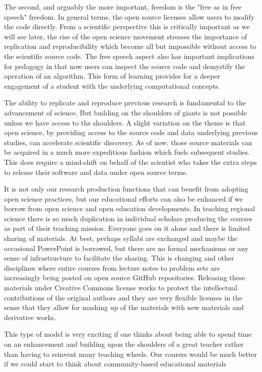 \documentclass[11pt]{article}
\begin{document}
The second, and arguably the more important, freedom is the "free as in free
speech" freedom. In general terms, the open source licenses allow users to
modify the code directly. From a scientific perspective this is critically
important as we will see later, the rise of the open science movement stresses
the importance of replication and reproducibility which become all but
impossible without access to the scientific source code. The free speech aspect
also has important implications for pedagogy in that now users can inspect the
source code and demystify the operation of an algorithm. This form of learning
provides for a deeper engagement of a student with the underlying computational
concepts.


The ability to replicate and reproduce previous research is fundamental to
the advancement of science. But building on the shoulders of giants is not
possible unless we have access to the shoulders. A slight variation on the
theme is that open science, by providing access to the source code and data
underlying previous studies, can accelerate scientific discovery. As of now, those
source materials can be acquired in a much more expeditious fashion which fuels
subsequent studies. This does require a mind-shift on behalf of
the scientist who takes the extra steps to release their software
and data under open source terms.

It is not only our research production functions that can benefit from adopting
open science practices, but our educational efforts can also be enhanced if we
borrow from open science and open education developments. In teaching regional
science there is so much duplication in individual scholars producing the
courses as part of their teaching mission. Everyone goes on it alone and there
is limited sharing of materials. At best, perhaps syllabi are exchanged and
maybe the occasional PowerPoint is borrowed, but there are no formal mechanisms
or any sense of infrastructure to facilitate the sharing. This is changing and
other disciplines where entire courses from lecture notes to problem sets are
increasingly being posted on open source GitHub repositories. Releasing these
materials under Creative Commons license works to protect the intellectual
contributions of the original authors and they are very flexible licenses in
the sense that they allow for mashing up of the materials with new materials
and derivative works.

This type of model is very exciting if one thinks about being able to spend
time on an enhancement  and building upon the shoulders of a great teacher
rather than having to reinvent many teaching wheels. Our courses would be much
better if we could start to think about community-based educational
materials
\end{document}
